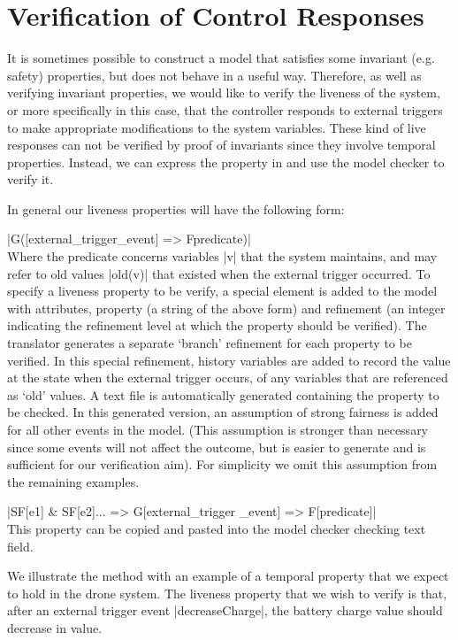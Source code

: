 

\section{Verification of Control Responses}\label{sec:verificationResponses}

It is sometimes possible to construct a model that satisfies some invariant (e.g. safety) properties, but does not behave in a useful way.
Therefore, as well as verifying invariant properties, we would like to verify the liveness of the system, or more specifically in this case, that the controller responds to external triggers to make appropriate modifications to the system variables. 
These kind of live responses can not be verified by proof of invariants since they involve temporal properties.
Instead, we can express the property in \LTL  and use the \PROB model checker to verify it.

In general our liveness properties will have the following form:

	|G([external_trigger_event] => F{predicate})|
\\
Where the predicate concerns variables |v| that the system maintains, and may refer to old values |old(v)| that existed when the external trigger occurred.
To specify a liveness property to be verify, a special \LTL element is added to the \SCXML model with attributes, property (a string of the above form)  and refinement (an integer indicating the refinement level at which the property should be verified).
The translator generates a separate `branch' refinement for each \LTL property to be verified. 
In this special refinement, history variables are added to record the value at the state when the external trigger occurs, of any variables that are referenced as `old' values.
A text file is automatically generated containing the \LTL property to be checked. 
In this generated version, an assumption of strong fairness is added for all other events in the model.
(This assumption is stronger than necessary since some events will not affect the outcome, but is easier to generate and is sufficient for our verification aim). 
For simplicity we omit this assumption from the remaining examples.

	|SF[e1] & SF[e2]... => G[external_trigger _event] => F[predicate]|
\\
This property can be copied and pasted into the \PROB model checker \LTL checking text field.

We illustrate the method with an example of a temporal property that we expect to hold in the drone \SCXML system. 
The liveness property that we wish to  verify is that, after an external trigger event |decreaseCharge|, the battery charge value should  decrease in value.

